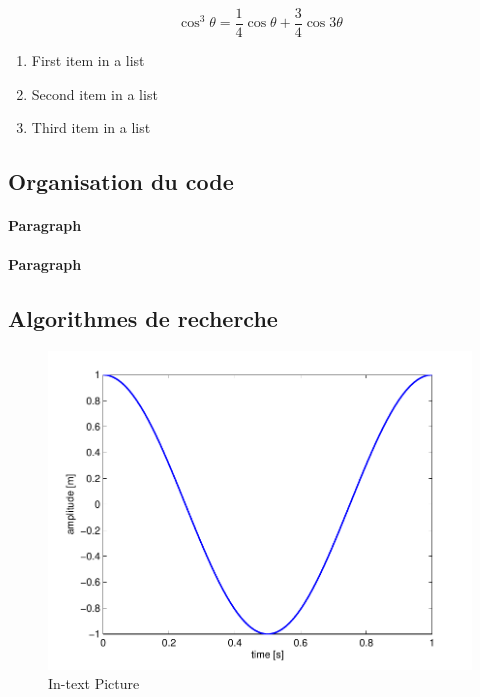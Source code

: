\documentclass[fleqn,10pt,french]{SelfArx} %
\begin{document}
\lipsum[4] %

\begin{equation}
\cos^3 \theta =\frac{1}{4}\cos\theta+\frac{3}{4}\cos 3\theta
\label{eq:refname2}
\end{equation}

\lipsum[5] %

\begin{enumerate}[noitemsep] %
\item First item in a list
\item Second item in a list
\item Third item in a list
\end{enumerate}

\subsection{Organisation du code}

\lipsum[6] %

\paragraph{Paragraph} \lipsum[7] %
\paragraph{Paragraph} \lipsum[8] %

\subsection{Algorithmes de recherche}

\lipsum[9] %

\begin{figure}[ht]\centering
\includegraphics[width=\linewidth]{results}
\caption{In-text Picture}
\label{fig:results}
\end{figure}
\end{document}
